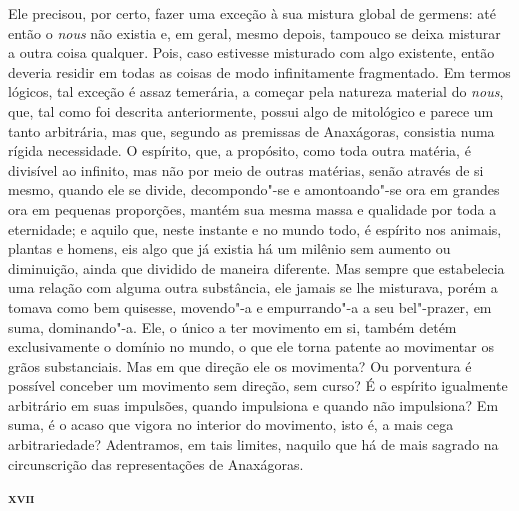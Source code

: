 Ele precisou, por certo, fazer uma exceção à sua mistura global de germens:
até então o \textit{nous} não existia e, em geral, mesmo depois, tampouco se
deixa misturar a outra coisa qualquer. Pois, caso estivesse misturado com
algo existente, então deveria residir em todas as coisas de modo
infinitamente fragmentado. Em termos lógicos, tal exceção é assaz temerária,
a começar pela natureza material do \textit{nous}, que, tal como 
foi descrita anteriormente, possui algo de mitológico e parece um tanto arbitrária, 
mas que, segundo as premissas de Anaxágoras, consistia numa rígida necessidade. 
O espírito, que, a propósito, como toda outra matéria, é divisível ao infinito, 
mas não por meio de outras
 matérias, senão através de si mesmo, quando ele se divide, decompondo"-se e
 amontoando"-se ora em grandes ora em pequenas proporções, mantém sua mesma
 massa e qualidade por toda a eternidade; e aquilo que, neste instante e no
 mundo todo, é espírito nos animais, plantas e homens, eis algo que já
 existia há um milênio sem aumento ou diminuição, ainda que dividido de
 maneira diferente. Mas sempre que estabelecia uma relação com alguma outra
 substância, ele jamais se lhe misturava, porém a tomava como bem quisesse,
 movendo"-a e empurrando"-a a seu bel"-prazer, em suma, dominando"-a. Ele, o
 único a ter movimento em si, também detém exclusivamente o domínio no mundo,
 o que ele torna patente ao movimentar os grãos substanciais. Mas em que
 direção ele os movimenta? Ou porventura é possível conceber um movimento sem
 direção, sem curso? É o espírito igualmente arbitrário em suas impulsões,
 quando impulsiona e quando não impulsiona? Em suma, é o acaso que vigora no
 interior do movimento, isto é, a mais cega arbitrariedade? Adentramos, em
 tais limites, naquilo que há de mais sagrado na circunscrição das
 representações de Anaxágoras. 

\bigskip
\textsc{\textbf{xvii}}
\bigskip


